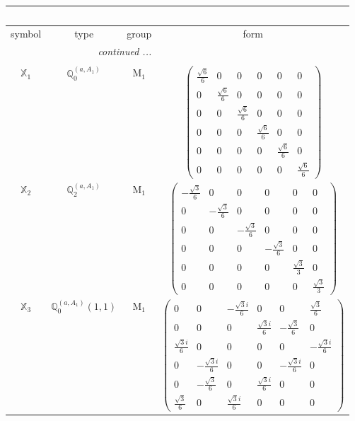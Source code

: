 \documentclass[fleqn,10pt,landscape]{article}
\begin{document}
\begin{itemize}
\begin{center}
\begin{longtable}{c|c|c|c}
\multicolumn{3}{l}{\tablename\ \thetable{}} \\
 \hline \hline
symbol & type & group & form \\ \hline \endhead

 \hline \hline
\multicolumn{3}{r}{\footnotesize\it continued ...} \\ \endfoot

 \hline \hline
\multicolumn{3}{r}{} \\ \endlastfoot

$ \mathbb{X}_{1} $ & $\mathbb{Q}_{0}^{(a,A_{1})}$ & M$_{1}$ & $\begin{pmatrix} \frac{\sqrt{6}}{6} & 0 & 0 & 0 & 0 & 0 \\ 0 & \frac{\sqrt{6}}{6} & 0 & 0 & 0 & 0 \\ 0 & 0 & \frac{\sqrt{6}}{6} & 0 & 0 & 0 \\ 0 & 0 & 0 & \frac{\sqrt{6}}{6} & 0 & 0 \\ 0 & 0 & 0 & 0 & \frac{\sqrt{6}}{6} & 0 \\ 0 & 0 & 0 & 0 & 0 & \frac{\sqrt{6}}{6} \end{pmatrix}$ \\
$ \mathbb{X}_{2} $ & $\mathbb{Q}_{2}^{(a,A_{1})}$ & M$_{1}$ & $\begin{pmatrix} - \frac{\sqrt{3}}{6} & 0 & 0 & 0 & 0 & 0 \\ 0 & - \frac{\sqrt{3}}{6} & 0 & 0 & 0 & 0 \\ 0 & 0 & - \frac{\sqrt{3}}{6} & 0 & 0 & 0 \\ 0 & 0 & 0 & - \frac{\sqrt{3}}{6} & 0 & 0 \\ 0 & 0 & 0 & 0 & \frac{\sqrt{3}}{3} & 0 \\ 0 & 0 & 0 & 0 & 0 & \frac{\sqrt{3}}{3} \end{pmatrix}$ \\
$ \mathbb{X}_{3} $ & $\mathbb{Q}_{0}^{(a,A_{1})}(1,1)$ & M$_{1}$ & $\begin{pmatrix} 0 & 0 & - \frac{\sqrt{3} i}{6} & 0 & 0 & \frac{\sqrt{3}}{6} \\ 0 & 0 & 0 & \frac{\sqrt{3} i}{6} & - \frac{\sqrt{3}}{6} & 0 \\ \frac{\sqrt{3} i}{6} & 0 & 0 & 0 & 0 & - \frac{\sqrt{3} i}{6} \\ 0 & - \frac{\sqrt{3} i}{6} & 0 & 0 & - \frac{\sqrt{3} i}{6} & 0 \\ 0 & - \frac{\sqrt{3}}{6} & 0 & \frac{\sqrt{3} i}{6} & 0 & 0 \\ \frac{\sqrt{3}}{6} & 0 & \frac{\sqrt{3} i}{6} & 0 & 0 & 0 \end{pmatrix}$ \\

\end{longtable}
\end{center}
\end{itemize}
\end{document}
